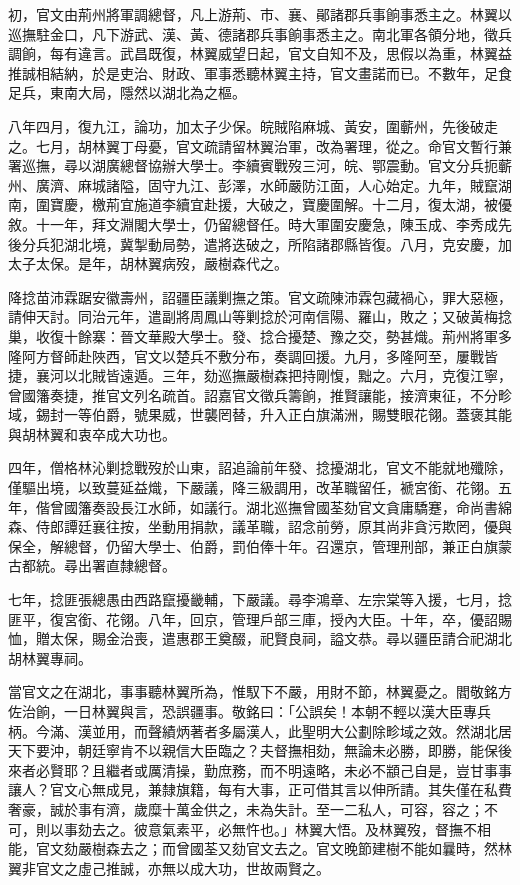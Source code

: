 \begin{pinyinscope}
初，官文由荊州將軍調總督，凡上游荊、市、襄、鄖諸郡兵事餉事悉主之。林翼以巡撫駐金口，凡下游武、漢、黃、德諸郡兵事餉事悉主之。南北軍各領分地，徵兵調餉，每有違言。武昌既復，林翼威望日起，官文自知不及，思假以為重，林翼益推誠相結納，於是吏治、財政、軍事悉聽林翼主持，官文畫諾而已。不數年，足食足兵，東南大局，隱然以湖北為之樞。

八年四月，復九江，論功，加太子少保。皖賊陷麻城、黃安，圍蘄州，先後破走之。七月，胡林翼丁母憂，官文疏請留林翼治軍，改為署理，從之。命官文暫行兼署巡撫，尋以湖廣總督協辦大學士。李續賓戰歿三河，皖、鄂震動。官文分兵扼蘄州、廣濟、麻城諸隘，固守九江、彭澤，水師嚴防江面，人心始定。九年，賊竄湖南，圍寶慶，檄荊宜施道李續宜赴援，大破之，寶慶圍解。十二月，復太湖，被優敘。十一年，拜文淵閣大學士，仍留總督任。時大軍圍安慶急，陳玉成、李秀成先後分兵犯湖北境，冀掣動局勢，遣將迭破之，所陷諸郡縣皆復。八月，克安慶，加太子太保。是年，胡林翼病歿，嚴樹森代之。

降捻苗沛霖踞安徽壽州，詔疆臣議剿撫之策。官文疏陳沛霖包藏禍心，罪大惡極，請伸天討。同治元年，遣副將周鳳山等剿捻於河南信陽、羅山，敗之；又破黃梅捻巢，收復十餘寨：晉文華殿大學士。發、捻合擾楚、豫之交，勢甚熾。荊州將軍多隆阿方督師赴陜西，官文以楚兵不敷分布，奏調回援。九月，多隆阿至，屢戰皆捷，襄河以北賊皆遠遁。三年，劾巡撫嚴樹森把持剛愎，黜之。六月，克復江寧，曾國籓奏捷，推官文列名疏首。詔嘉官文徵兵籌餉，推賢讓能，接濟東征，不分畛域，錫封一等伯爵，號果威，世襲罔替，升入正白旗滿洲，賜雙眼花翎。蓋褒其能與胡林翼和衷卒成大功也。

四年，僧格林沁剿捻戰歿於山東，詔追論前年發、捻擾湖北，官文不能就地殲除，僅驅出境，以致蔓延益熾，下嚴議，降三級調用，改革職留任，褫宮銜、花翎。五年，偕曾國籓奏設長江水師，如議行。湖北巡撫曾國荃劾官文貪庸驕蹇，命尚書綿森、侍郎譚廷襄往按，坐動用捐款，議革職，詔念前勞，原其尚非貪污欺罔，優與保全，解總督，仍留大學士、伯爵，罰伯俸十年。召還京，管理刑部，兼正白旗蒙古都統。尋出署直隸總督。

七年，捻匪張總愚由西路竄擾畿輔，下嚴議。尋李鴻章、左宗棠等入援，七月，捻匪平，復宮銜、花翎。八年，回京，管理戶部三庫，授內大臣。十年，卒，優詔賜恤，贈太保，賜金治喪，遣惠郡王奠醊，祀賢良祠，謚文恭。尋以疆臣請合祀湖北胡林翼專祠。

當官文之在湖北，事事聽林翼所為，惟馭下不嚴，用財不節，林翼憂之。閻敬銘方佐治餉，一日林翼與言，恐誤疆事。敬銘曰：「公誤矣！本朝不輕以漢大臣專兵柄。今滿、漢並用，而聲績炳著者多屬漢人，此聖明大公劃除畛域之效。然湖北居天下要沖，朝廷寧肯不以親信大臣臨之？夫督撫相劾，無論未必勝，即勝，能保後來者必賢耶？且繼者或厲清操，勤庶務，而不明遠略，未必不顓己自是，豈甘事事讓人？官文心無成見，兼隸旗籍，每有大事，正可借其言以伸所請。其失僅在私費奢豪，誠於事有濟，歲糜十萬金供之，未為失計。至一二私人，可容，容之；不可，則以事劾去之。彼意氣素平，必無忤也。」林翼大悟。及林翼歿，督撫不相能，官文劾嚴樹森去之；而曾國荃又劾官文去之。官文晚節建樹不能如曩時，然林翼非官文之虛己推誠，亦無以成大功，世故兩賢之。


\end{pinyinscope}
